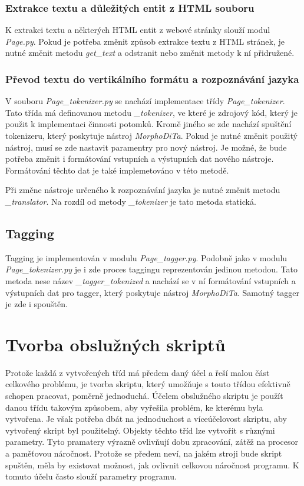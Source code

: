 \subsubsection{Extrakce textu a důležitých entit z HTML souboru}
K extrakci textu a některých HTML entit z webové stránky slouží modul \textit{Page.py}.
Pokud je potřeba změnit způsob extrakce textu z HTML stránek, je nutné změnit
metodu \textit{get\_text} a odstranit nebo změnit metody k ní přidružené.

\subsubsection{Převod textu do vertikálního formátu a rozpoznávání jazyka}
V souboru \textit{Page\_tokenizer.py} se nachází implementace třídy \textit{Page\_tokenizer}.
Tato třída má definovanou metodu \textit{\_tokenizer}, ve které je zdrojový kód, který
je použit k implementaci činnosti potomků. Kromě jiného se zde nachází spuštění tokenizeru,
který poskytuje nástroj \textit{MorphoDiTa}. Pokud je nutné změnit použitý nástroj,
musí se zde nastavit paramentry pro nový nástroj. Je možné, že bude potřeba změnit i formátování
vstupních a výstupních dat nového nástroje. Formátování těchto dat je také implemetováno v této
metodě.

Při změne nástroje určeného k rozpoznávání jazyka je nutné změnit metodu \textit{\_translator}.
Na rozdíl od metody \textit{\_tokenizer} je tato metoda statická.

\subsection{Tagging}
Tagging je implementován v modulu \textit{Page\_tagger.py}. Podobně jako v modulu
\textit{Page\_tokenizer.py} je i zde proces taggingu reprezentován jedinou metodou.
Tato metoda nese název \textit{\_tagger\_tokenized} a nachází se v ní formátování
vstupních a výstupních dat pro tagger, který poskytuje nástroj \textit{MorphoDiTa}.
Samotný tagger je zde i spouštěn.

\section{Tvorba obslužných skriptů}
Protože každá z vytvořených tříd má předem daný účel a řeší malou část celkového problému,
je tvorba skriptu, který umožňuje s touto třídou efektivně schopen pracovat, poměrně jednoduchá. Účelem obslužného skriptu
je použít danou třídu takovým způsobem, aby vyřešila problém, ke kterému byla vytvořena. Je však
potřeba dbát na jednoduchost a víceúčelovost skriptu, aby vytvořený skript byl použitelný. Objekty
těchto tříd lze vytvořit s různými parametry. Tyto pramatery výrazně ovlivňují dobu zpracování,
zátěž na procesor a paměťovou náročnost. Protože se předem neví, na jakém stroji bude skript spuštěn,
měla by existovat možnost, jak ovlivnit celkovou náročnost programu. K tomuto účelu často slouží
parametry programu.

